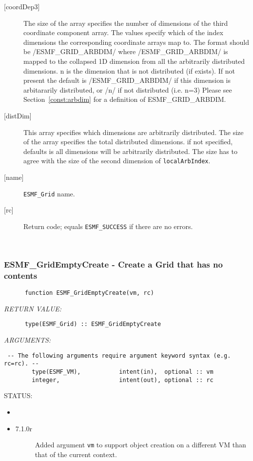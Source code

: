\begin{description}
   \item[{[coordDep3]}]
       The size of the array specifies the number of dimensions of the
       third coordinate component array. The values specify which
       of the index dimensions the corresponding coordinate
       arrays map to. The format should be /ESMF\_GRID\_ARBDIM/ where
       /ESMF\_GRID\_ARBDIM/ is mapped to the collapsed 1D dimension from all
       the arbitrarily distributed dimensions.  n is the dimension that
       is not distributed (if exists).
       If not present the default is /ESMF\_GRID\_ARBDIM/ if this dimension
       is arbitararily distributed, or /n/ if not distributed (i.e. n=3)
        Please see Section~\ref{const:arbdim} for a definition of ESMF\_GRID\_ARBDIM.
   \item[{[distDim]}]
         This array specifies which dimensions are arbitrarily distributed.
         The size of the array specifies the total distributed dimensions.
         if not specified, defaults is all dimensions will be arbitrarily
         distributed.  The size has to agree with the size of the second
         dimension of {\tt localArbIndex}.
   \item[{[name]}]
            {\tt ESMF\_Grid} name.
   \item[{[rc]}]
        Return code; equals {\tt ESMF\_SUCCESS} if there are no errors.
   \end{description}
   
 
\mbox{}\hrulefill\ 
 
\subsubsection [ESMF\_GridEmptyCreate] {ESMF\_GridEmptyCreate - Create a Grid that has no contents}


 
\begin{verbatim}      function ESMF_GridEmptyCreate(vm, rc)\end{verbatim}{\em RETURN VALUE:}
\begin{verbatim}      type(ESMF_Grid) :: ESMF_GridEmptyCreate\end{verbatim}{\em ARGUMENTS:}
\begin{verbatim} -- The following arguments require argument keyword syntax (e.g. rc=rc). --
        type(ESMF_VM),           intent(in),  optional :: vm
        integer,                 intent(out), optional :: rc\end{verbatim}
{\sf STATUS:}
   \begin{itemize}
   \item{}
   \item{}
   \begin{description}
   \item[7.1.0r] Added argument {\tt vm} to support object creation on a
                 different VM than that of the current context.
   \end{description}
   \end{itemize}
  
